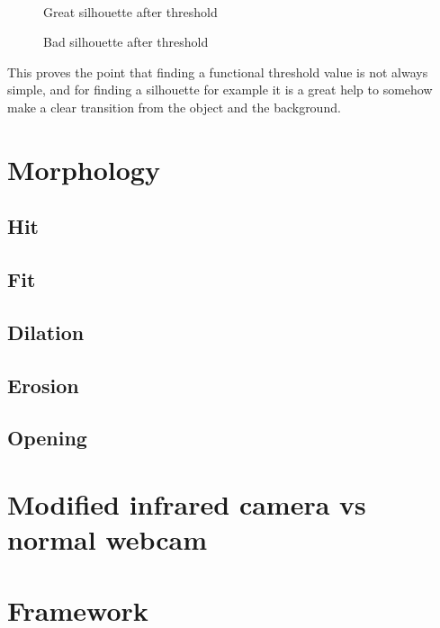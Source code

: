 \begin{figure}[htbp]
\begin{minipage}[b]{0.45\textwidth}
\end{minipage} \\ %
\begin{minipage}[t]{0.45\textwidth}
\caption{Great silhouette after threshold} %
\label{fig:SimpleThresholdAfter}
\end{minipage} \hfill
\begin{minipage}[t]{0.45\textwidth}
\caption{Bad silhouette after threshold} %
\label{fig:ComplicatedThresholdAfter}
\end{minipage}
\end{figure}
 
This proves the point that finding a functional threshold value is not always simple, and for finding a silhouette for example it is a great help to somehow make a clear transition from the object and the background.

\section{Morphology}
\subsection{Hit}
\subsection{Fit}
\subsection{Dilation}
\subsection{Erosion}
\subsection{Opening}
\section{Modified infrared camera vs normal webcam}
\section{Framework}
